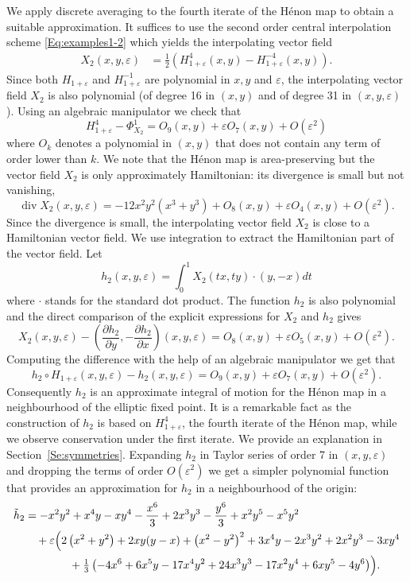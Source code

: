 \documentclass[a4paper,12pt]{article}
\begin{document}
We apply discrete averaging  to  the fourth iterate of 
the Hénon map  to obtain a suitable approximation.  
It suffices to use the second order central
interpolation scheme  \eqref{Eq:examples1-2} which yields
the interpolating vector field
\[
\begin{split}
X_2(x,y,\varepsilon)&=\tfrac12\left(H^4_{1+\varepsilon}(x,y)- H^{-4}_{1+\varepsilon}(x,y)\right).
\end{split}
\]
Since both $H_{1+\varepsilon}$ and $H_{1+\varepsilon}^{-1}$
are polynomial in $x,y$ and $\varepsilon$, the interpolating
vector field $X_2$ is also polynomial (of degree 16 in $(x,y)$
and of degree 31 in $(x,y,\varepsilon)$). 
Using an algebraic manipulator we check that
\[
H_{1+\varepsilon}^4-\Phi_{X_2}^1=O_{9}(x,y)+\varepsilon O_7(x,y)+O(\varepsilon^2)
\] 
where $O_k$ denotes a polynomial in $(x,y)$
that does not contain any term of order lower than $k$.
We note that the Hénon map is area-preserving but the vector field $X_2$ is only approximately Hamiltonian: 
its divergence is small but not vanishing,
\[
\operatorname{div }X_2(x,y,\varepsilon)= -12x^2y^2(x^3+y^3)+
O_8(x,y) 
 + 
\varepsilon O_4(x,y)
+O(\varepsilon^2)
.
\]
Since the divergence is small, the interpolating vector field $X_2$ is close
to a Hamiltonian vector field. We use integration to
extract the Hamiltonian part of the vector field. Let
\[
h_2(x,y,\varepsilon)=\int_0^1 X_2(t x,t y)\cdot(y,-x)dt 
\]
where $\cdot$ stands for the standard dot product. The function $ h_2$ is also polynomial and the direct comparison of the explicit expressions for $X_2$ and $ h_2$ 
gives
\[
X_2(x,y,\varepsilon)-\left(\frac{\partial  h_2}{\partial y}
,-\frac{\partial  h_2}{\partial x}\right) (x,y,\varepsilon)
=
O_8(x,y)+\varepsilon O_5(x,y)+O(\varepsilon^2).
\]
Computing the difference with the help of an algebraic manipulator we get that
\[
 h_2\circ  H_{1+\varepsilon}(x,y,\varepsilon)- h_2(x,y,\varepsilon)=O_9(x,y)+\varepsilon O_7(x,y)+O(\varepsilon^2).
\]
Consequently $ h_2$ is an approximate integral of motion 
for the Hénon map in a neighbourhood of the elliptic fixed point.
It is a remarkable fact as the construction of $ h_2$
is based on $H_{1+\varepsilon}^4$, the fourth iterate of the Hénon map,
while we observe conservation under the first iterate.
We provide an explanation in Section~\ref{Se:symmetries}.
Expanding $h_2$ in Taylor series of order 7 in $(x,y,\varepsilon)$ and dropping the terms of order $O(\varepsilon^2)$ we get
 a simpler polynomial function
 that provides an approximation for $h_2$ in a
neighbourhood of the origin:
\[
\begin{split}
\tilde h_2&=
- x^2 y^2+ x^4 y-x y^4-\frac{x^6}{3}+2 x^3 y^3-\frac{y^6}{3}+
  x^2 y^5-x^5 y^2
   \\&\quad
+\varepsilon\Bigl(
2  \left(x^2+y^2\right)+2  x y (y-x)+
\left(x^2-y^2\right)^2+ 3   x^4 y-2 x^3 y^2+2 x^2 y^3-3 x y^4
\\
&\qquad\qquad+
\tfrac{1}{3} \left(-4 x^6+6 x^5 y-17 x^4 y^2+24 x^3 y^3-17 x^2 y^4+6 x y^5-4 y^6\right)
\Bigr).
\end{split}
\]
\end{document}
